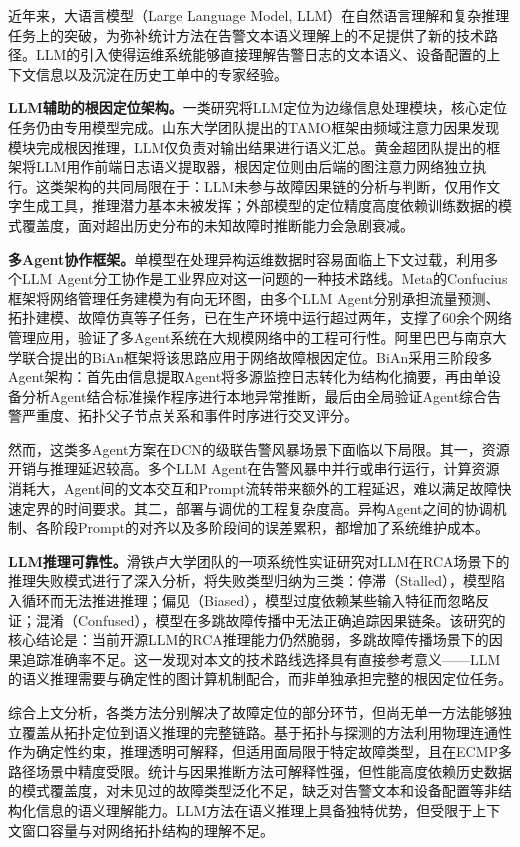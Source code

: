 近年来，大语言模型（Large Language Model, LLM）在自然语言理解和复杂推理任务上的突破，为弥补统计方法在告警文本语义理解上的不足提供了新的技术路径。LLM的引入使得运维系统能够直接理解告警日志的文本语义、设备配置的上下文信息以及沉淀在历史工单中的专家经验。

\textbf{LLM辅助的根因定位架构。}一类研究将LLM定位为边缘信息处理模块，核心定位任务仍由专用模型完成。山东大学团队提出的TAMO框架由频域注意力因果发现模块完成根因推理，LLM仅负责对输出结果进行语义汇总。黄金超团队提出的框架将LLM用作前端日志语义提取器，根因定位则由后端的图注意力网络独立执行。这类架构的共同局限在于：LLM未参与故障因果链的分析与判断，仅用作文字生成工具，推理潜力基本未被发挥；外部模型的定位精度高度依赖训练数据的模式覆盖度，面对超出历史分布的未知故障时推断能力会急剧衰减。

\textbf{多Agent协作框架。}单模型在处理异构运维数据时容易面临上下文过载，利用多个LLM Agent分工协作是工业界应对这一问题的一种技术路线。Meta的Confucius框架将网络管理任务建模为有向无环图，由多个LLM Agent分别承担流量预测、拓扑建模、故障仿真等子任务，已在生产环境中运行超过两年，支撑了60余个网络管理应用，验证了多Agent系统在大规模网络中的工程可行性。阿里巴巴与南京大学联合提出的BiAn框架将该思路应用于网络故障根因定位。BiAn采用三阶段多Agent架构：首先由信息提取Agent将多源监控日志转化为结构化摘要，再由单设备分析Agent结合标准操作程序进行本地异常推断，最后由全局验证Agent综合告警严重度、拓扑父子节点关系和事件时序进行交叉评分。

然而，这类多Agent方案在DCN的级联告警风暴场景下面临以下局限。其一，资源开销与推理延迟较高。多个LLM Agent在告警风暴中并行或串行运行，计算资源消耗大，Agent间的文本交互和Prompt流转带来额外的工程延迟，难以满足故障快速定界的时间要求。其二，部署与调优的工程复杂度高。异构Agent之间的协调机制、各阶段Prompt的对齐以及多阶段间的误差累积，都增加了系统维护成本。


\textbf{LLM推理可靠性。}滑铁卢大学团队的一项系统性实证研究对LLM在RCA场景下的推理失败模式进行了深入分析，将失败类型归纳为三类：停滞（Stalled），模型陷入循环而无法推进推理；偏见（Biased），模型过度依赖某些输入特征而忽略反证；混淆（Confused），模型在多跳故障传播中无法正确追踪因果链条。该研究的核心结论是：当前开源LLM的RCA推理能力仍然脆弱，多跳故障传播场景下的因果追踪准确率不足。这一发现对本文的技术路线选择具有直接参考意义——LLM的语义推理需要与确定性的图计算机制配合，而非单独承担完整的根因定位任务。


综合上文分析，各类方法分别解决了故障定位的部分环节，但尚无单一方法能够独立覆盖从拓扑定位到语义推理的完整链路。基于拓扑与探测的方法利用物理连通性作为确定性约束，推理透明可解释，但适用面局限于特定故障类型，且在ECMP多路径场景中精度受限。统计与因果推断方法可解释性强，但性能高度依赖历史数据的模式覆盖度，对未见过的故障类型泛化不足，缺乏对告警文本和设备配置等非结构化信息的语义理解能力。LLM方法在语义推理上具备独特优势，但受限于上下文窗口容量与对网络拓扑结构的理解不足。



